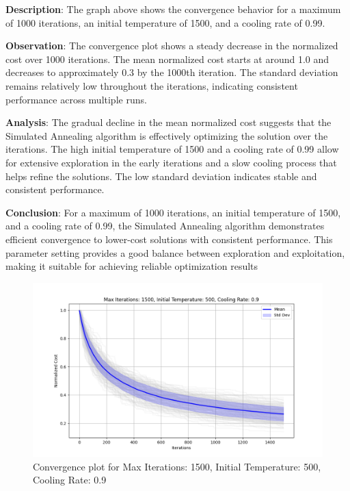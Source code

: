 \documentclass[
]{article}
\begin{document}
    \textbf{Description}: The graph above shows the convergence behavior for a maximum of 1000 iterations, an initial temperature of 1500, and a cooling rate of 0.99.

    \textbf{Observation}: The convergence plot shows a steady decrease in the normalized cost over 1000 iterations. The mean normalized cost starts at around 1.0 and decreases to approximately 0.3 by the 1000th iteration. The standard deviation remains relatively low throughout the iterations, indicating consistent performance across multiple runs.

    \textbf{Analysis}: The gradual decline in the mean normalized cost suggests that the Simulated Annealing algorithm is effectively optimizing the solution over the iterations. The high initial temperature of 1500 and a cooling rate of 0.99 allow for extensive exploration in the early iterations and a slow cooling process that helps refine the solutions. The low standard deviation indicates stable and consistent performance.

    \textbf{Conclusion}: For a maximum of 1000 iterations, an initial temperature of 1500, and a cooling rate of 0.99, the Simulated Annealing algorithm demonstrates efficient convergence to lower-cost solutions with consistent performance. This parameter setting provides a good balance between exploration and exploitation, making it suitable for achieving reliable optimization results

    \begin{figure}[H]
        \centering
        \includegraphics[width=\textwidth]{simulated_annealing/max_iter_1500_init_temp_500_cooling_rate_0.9}
        \caption{Convergence plot for Max Iterations: 1500, Initial Temperature: 500, Cooling Rate: 0.9}
        \label{fig:sa_1500_500_0.9}
    \end{figure}
\end{document}
